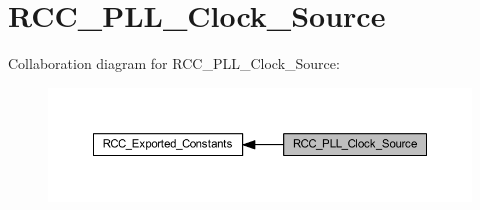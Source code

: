 \hypertarget{group___r_c_c___p_l_l___clock___source}{}\section{R\+C\+C\+\_\+\+P\+L\+L\+\_\+\+Clock\+\_\+\+Source}
\label{group___r_c_c___p_l_l___clock___source}
Collaboration diagram for R\+C\+C\+\_\+\+P\+L\+L\+\_\+\+Clock\+\_\+\+Source\+:\nopagebreak
\begin{figure}[H]
\begin{center}
\leavevmode
\includegraphics[width=350pt]{group___r_c_c___p_l_l___clock___source}
\end{center}
\end{figure}
